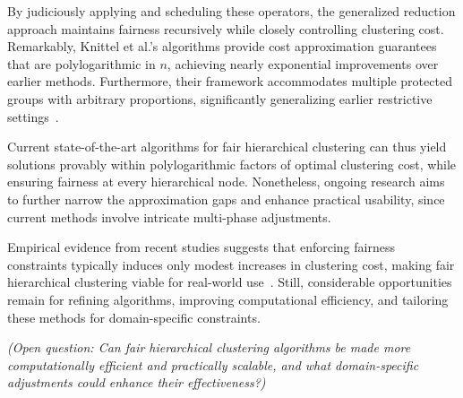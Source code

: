 By judiciously applying and scheduling these operators, the generalized reduction approach maintains fairness recursively while closely controlling clustering cost. Remarkably, Knittel et al.’s algorithms provide cost approximation guarantees that are polylogarithmic in \( n \), achieving nearly exponential improvements over earlier methods. Furthermore, their framework accommodates multiple protected groups with arbitrary proportions, significantly generalizing earlier restrictive settings~\cite{knittel2023generalized}.

Current state-of-the-art algorithms for fair hierarchical clustering can thus yield solutions provably within polylogarithmic factors of optimal clustering cost, while ensuring fairness at every hierarchical node. Nonetheless, ongoing research aims to further narrow the approximation gaps and enhance practical usability, since current methods involve intricate multi-phase adjustments.

Empirical evidence from recent studies suggests that enforcing fairness constraints typically induces only modest increases in clustering cost, making fair hierarchical clustering viable for real-world use~\cite{ahmadian2020fairhc,knittel2023generalized}. Still, considerable opportunities remain for refining algorithms, improving computational efficiency, and tailoring these methods for domain-specific constraints.

\emph{(Open question: Can fair hierarchical clustering algorithms be made more computationally efficient and practically scalable, and what domain-specific adjustments could enhance their effectiveness?)}